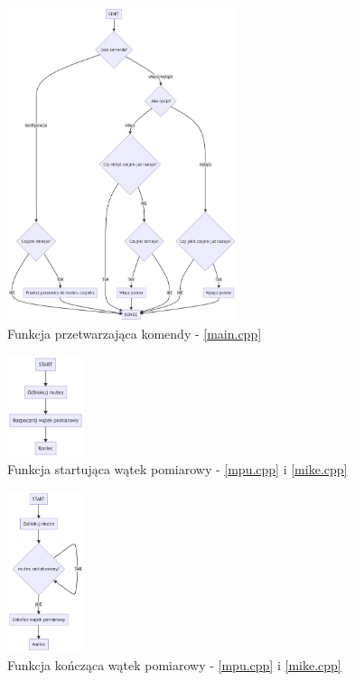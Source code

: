 \documentclass[12pt,oneside,a4paper]{book}
\theoremstyle{break}
\begin{document}
\begin{figure}[H]
    \begin{center}
        \includegraphics[width=0.6\textwidth]{uc-command_function.jpeg}
        \caption{Funkcja przetwarzająca komendy - \ref*{main.cpp}}
        \label{rys:uc-command_function}
    \end{center}
\end{figure}

\begin{figure}[H]
    \begin{center}
        \includegraphics[width=0.2\textwidth]{uc-start_task}
        \caption{Funkcja startująca wątek pomiarowy - \ref*{mpu.cpp} i \ref*{mike.cpp}}
        \label{rys:uc-start_task}
    \end{center}
\end{figure}

\begin{figure}[H]
    \begin{center}
        \includegraphics[width=0.2\textwidth]{uc-end_task.jpeg}
        \caption{Funkcja kończąca wątek pomiarowy - \ref*{mpu.cpp} i \ref*{mike.cpp}}
        \label{rys:uc-end_task}
    \end{center}
\end{figure}
\end{document}
